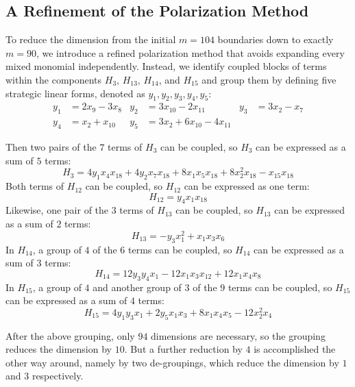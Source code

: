 \documentclass[11pt,a4paper]{article}
\begin{document}
\subsection{A Refinement of the Polarization Method}

To reduce the dimension from the initial $m = 104$ boundaries down to exactly $m = 90$, we introduce a refined polarization method that avoids expanding every mixed monomial independently. Instead, we identify coupled blocks of terms within the components $H_3$, $H_{13}$, $H_{14}$, and $H_{15}$ and group them by defining five strategic linear forms, denoted as $y_1, y_2, y_3, y_4, y_5$:
\begin{align*}
y_1 &= 2 x_9 - 3 x_8 & y_2 &= 3 x_{10} - 2 x_{11} & y_3 &= 3 x_2 - x_7 \\
y_4 &= x_2 + x_{10} & y_5 &= 3 x_2 + 6 x_{10} - 4 x_{11} 
\end{align*}

Then two pairs of the $7$ terms of $H_3$ can be coupled, so $H_3$ can be expressed as a sum of $5$ terms:
$$
H_3 = 4 y_1 x_4 x_{18} + 4 y_2 x_7 x_{18} + 8 x_1 x_5 x_{18} + 8 x_2^2  x_18 - x_{15} x_{18}
$$
Both terms of $H_{12}$ can be coupled, so $H_{12}$ can be expressed as one term:
$$
H_{12} = y_4 x_1 x_{18}
$$
Likewise, one pair of the $3$ terms of $H_{13}$ can be coupled, so $H_{13}$ can be expressed as a sum of $2$ terms:
$$
H_{13} = -y_3 x_1^2 + x_1 x_3 x_6
$$
In $H_{14}$, a group of $4$ of the $6$ terms can be coupled, so $H_{14}$ can be expressed as a sum of $3$ terms:
$$
H_{14} = 12 y_3 y_4 x_1 - 12 x_1 x_3 x_{12} + 12 x_1 x_4 x_8
$$
In $H_{15}$, a group of $4$ and another group of $3$ of the $9$ terms can be coupled, so $H_{15}$ can be expressed as a sum of $4$ terms:
$$
H_{15} = 4 y_1 y_3 x_1 + 2 y_5 x_1 x_3 + 8 x_1 x_4 x_5 - 12 x_2^2 x_4
$$

After the above grouping, only $94$ dimensions are necessary, so the grouping reduces the dimension by $10$. But a further reduction by $4$ is accomplished the other way around, namely by two de-groupings, which reduce the dimension by $1$ and $3$ respectively.
\end{document}
